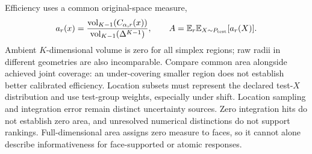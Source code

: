 Efficiency uses a common original-space measure,
\begin{equation}
 a_r(x)=\frac{\operatorname{vol}_{K-1}(C_{\alpha,r}(x))}
 {\operatorname{vol}_{K-1}(\Delta^{K-1})},\qquad
 A=\mathbb E_r\mathbb E_{X\sim P_{\rm test}}[a_r(X)].
 \label{eq:area}
\end{equation}
Ambient $K$-dimensional volume is zero for all simplex regions; raw radii in different geometries are also incomparable. Compare common area alongside achieved joint coverage: an under-covering smaller region does not establish better calibrated efficiency. Location subsets must represent the declared test-$X$ distribution and use test-group weights, especially under shift. Location sampling and integration error remain distinct uncertainty sources. Zero integration hits do not establish zero area, and unresolved numerical distinctions do not support rankings. Full-dimensional area assigns zero measure to faces, so it cannot alone describe informativeness for face-supported or atomic responses.
